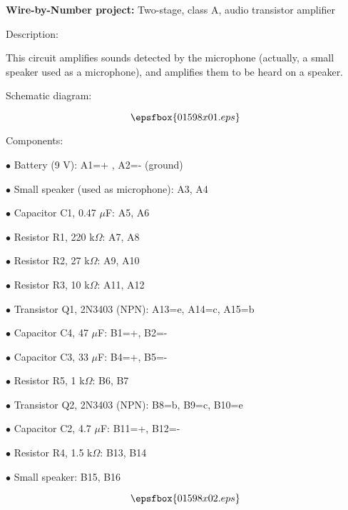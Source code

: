 

\centerline{{\bf Wire-by-Number project:} Two-stage, class A, audio transistor amplifier} \bigskip 

\noindent Description:

This circuit amplifies sounds detected by the microphone (actually, a small speaker used as a microphone), and amplifies them to be heard on a speaker.

\vskip 10pt

\goodbreak

\noindent Schematic diagram: 

$$\epsfbox{01598x01.eps}$$

\vskip 10pt

\goodbreak

\noindent Components:

\medskip
\item{$\bullet$} Battery (9 V): A1=+ , A2=- (ground)
\item{$\bullet$} Small speaker (used as microphone): A3, A4
\item{$\bullet$} Capacitor C1, 0.47 $\mu$F: A5, A6
\item{$\bullet$} Resistor R1, 220 k$\Omega$: A7, A8
\item{$\bullet$} Resistor R2, 27 k$\Omega$: A9, A10
\item{$\bullet$} Resistor R3, 10 k$\Omega$: A11, A12
\item{$\bullet$} Transistor Q1, 2N3403 (NPN): A13=e, A14=c, A15=b
\item{$\bullet$} Capacitor C4, 47 $\mu$F: B1=+, B2=-
\item{$\bullet$} Capacitor C3, 33 $\mu$F: B4=+, B5=-
\item{$\bullet$} Resistor R5, 1 k$\Omega$: B6, B7
\item{$\bullet$} Transistor Q2, 2N3403 (NPN): B8=b, B9=c, B10=e
\item{$\bullet$} Capacitor C2, 4.7 $\mu$F: B11=+, B12=-
\item{$\bullet$} Resistor R4, 1.5 k$\Omega$: B13, B14
\item{$\bullet$} Small speaker: B15, B16
\medskip

$$\epsfbox{01598x02.eps}$$

\vskip 10pt

\goodbreak

